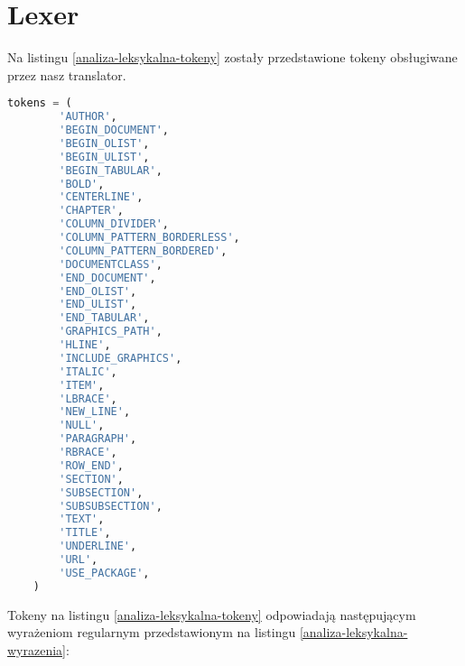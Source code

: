 \section{Lexer}
Na listingu \ref{analiza-leksykalna-tokeny} zostały przedstawione tokeny obsługiwane przez nasz translator.

\begin{lstlisting}[language={Python}, caption={Analiza leksykalna - podział na tokeny}, label={analiza-leksykalna-tokeny}]
    tokens = (
        'AUTHOR',
        'BEGIN_DOCUMENT',
        'BEGIN_OLIST',
        'BEGIN_ULIST',
        'BEGIN_TABULAR',
        'BOLD',
        'CENTERLINE',
        'CHAPTER',
        'COLUMN_DIVIDER',
        'COLUMN_PATTERN_BORDERLESS',
        'COLUMN_PATTERN_BORDERED',
        'DOCUMENTCLASS',
        'END_DOCUMENT',
        'END_OLIST',
        'END_ULIST',
        'END_TABULAR',
        'GRAPHICS_PATH',
        'HLINE',
        'INCLUDE_GRAPHICS',
        'ITALIC',
        'ITEM',
        'LBRACE',
        'NEW_LINE',
        'NULL',
        'PARAGRAPH',
        'RBRACE',
        'ROW_END',
        'SECTION',
        'SUBSECTION',
        'SUBSUBSECTION',
        'TEXT',
        'TITLE',
        'UNDERLINE',
        'URL',
        'USE_PACKAGE',
    )
\end{lstlisting}

Tokeny na listingu \ref{analiza-leksykalna-tokeny} odpowiadają następującym wyrażeniom regularnym 
przedstawionym na listingu \ref{analiza-leksykalna-wyrazenia}:

